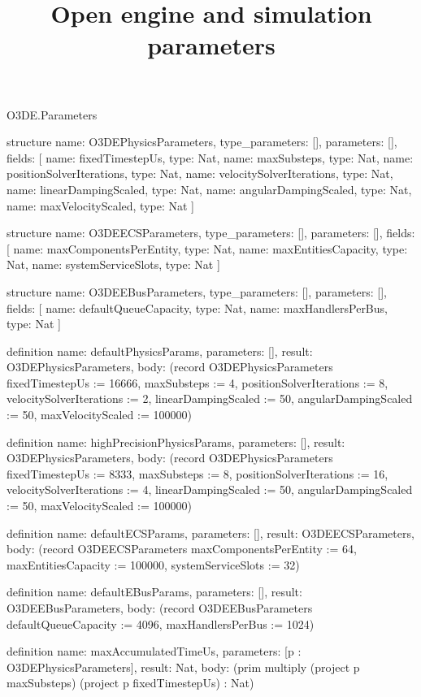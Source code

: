 \begin{lexlean}{O3DE.Parameters}
\title{Open engine and simulation parameters}
\begin{semanticmodule}
structure{
  name: O3DEPhysicsParameters,
  type_parameters: [],
  parameters: [],
  fields: [
    {name: fixedTimestepUs, type: Nat},
    {name: maxSubsteps, type: Nat},
    {name: positionSolverIterations, type: Nat},
    {name: velocitySolverIterations, type: Nat},
    {name: linearDampingScaled, type: Nat},
    {name: angularDampingScaled, type: Nat},
    {name: maxVelocityScaled, type: Nat}
  ]
}

structure{
  name: O3DEECSParameters,
  type_parameters: [],
  parameters: [],
  fields: [
    {name: maxComponentsPerEntity, type: Nat},
    {name: maxEntitiesCapacity, type: Nat},
    {name: systemServiceSlots, type: Nat}
  ]
}

structure{
  name: O3DEEBusParameters,
  type_parameters: [],
  parameters: [],
  fields: [
    {name: defaultQueueCapacity, type: Nat},
    {name: maxHandlersPerBus, type: Nat}
  ]
}

definition{
  name: defaultPhysicsParams,
  parameters: [],
  result: O3DEPhysicsParameters,
  body: (record O3DEPhysicsParameters {fixedTimestepUs := 16666, maxSubsteps := 4, positionSolverIterations := 8, velocitySolverIterations := 2, linearDampingScaled := 50, angularDampingScaled := 50, maxVelocityScaled := 100000})
}

definition{
  name: highPrecisionPhysicsParams,
  parameters: [],
  result: O3DEPhysicsParameters,
  body: (record O3DEPhysicsParameters {fixedTimestepUs := 8333, maxSubsteps := 8, positionSolverIterations := 16, velocitySolverIterations := 4, linearDampingScaled := 50, angularDampingScaled := 50, maxVelocityScaled := 100000})
}

definition{
  name: defaultECSParams,
  parameters: [],
  result: O3DEECSParameters,
  body: (record O3DEECSParameters {maxComponentsPerEntity := 64, maxEntitiesCapacity := 100000, systemServiceSlots := 32})
}

definition{
  name: defaultEBusParams,
  parameters: [],
  result: O3DEEBusParameters,
  body: (record O3DEEBusParameters {defaultQueueCapacity := 4096, maxHandlersPerBus := 1024})
}

definition{
  name: maxAccumulatedTimeUs,
  parameters: [p : O3DEPhysicsParameters],
  result: Nat,
  body: (prim multiply (project p maxSubsteps) (project p fixedTimestepUs) : Nat)
}


\end{semanticmodule}
\end{lexlean}
